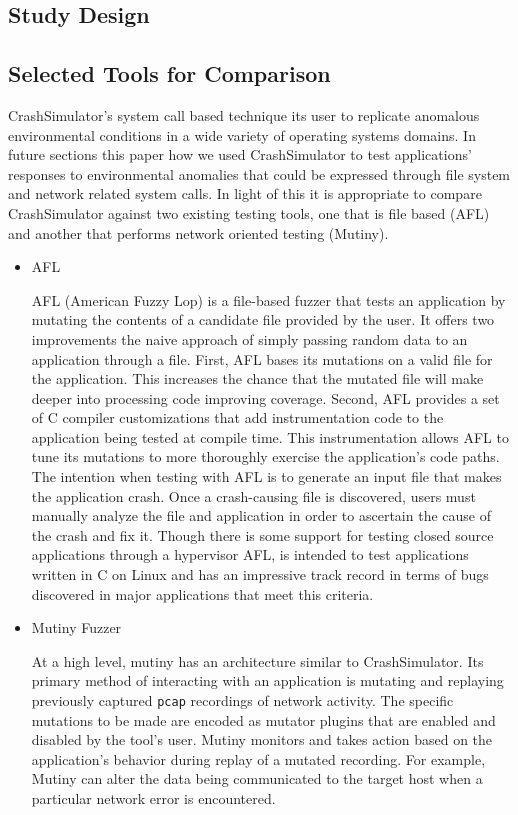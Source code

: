 \subsection{Study Design}


\subsection{Selected Tools for Comparison}

CrashSimulator's system call based technique its user to replicate
anomalous environmental conditions in a wide variety of operating systems
domains.  In future sections this paper how we used CrashSimulator to test
applications' responses to environmental anomalies that could be expressed
through file system and network related system calls.  In light of this it
is appropriate to compare
CrashSimulator against two existing testing tools, one that is
file based (AFL) and another that performs network oriented testing
(Mutiny).

\begin{itemize}
\item{AFL}

AFL (American Fuzzy Lop) is a file-based fuzzer that tests an application
by mutating the contents of a candidate file provided by the user.  It
offers two improvements the naive approach of simply passing random data to
an application through a file.  First, AFL bases its mutations on a valid
file for the application.  This increases the chance that the mutated file
will make deeper into processing code improving coverage.  Second, AFL
provides a set of C compiler customizations that add instrumentation code
to the application being tested at compile time.  This instrumentation
allows AFL to tune its mutations to more thoroughly exercise the
application's code paths.  The intention when testing with AFL is to
generate an input file that makes the application crash.  Once a
crash-causing file is discovered, users must manually analyze the file and
application in order to ascertain the cause of the crash and fix it.
Though there is some support for testing closed source applications through
a hypervisor AFL, is intended to test applications written in C on Linux
and has an impressive track record in terms of bugs discovered in major
applications that meet this criteria.

\item{Mutiny Fuzzer}

At a high level, mutiny has an architecture similar to CrashSimulator.  Its
primary method of interacting with an application is mutating and
replaying previously captured {\tt pcap} recordings of network
activity.  The specific mutations to be made are encoded as mutator
plugins that are enabled and disabled by the tool's user.  Mutiny
monitors and takes action based on the application's behavior
during replay of a mutated recording.  For example, Mutiny can
alter the data being communicated to the target host when a
particular network error is encountered.

\end{itemize}

